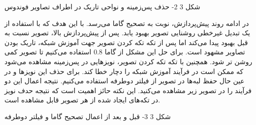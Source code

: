  
شکل ‏3 2- حذف پس‌زمینه و نواحی تاریک در اطراف تصاویر فوندوس

در ادامه روند پیش‌پردازش، نوبت به تصحیح گاما می‌رسد. با این هدف که با استفاده از یک تبدیل غیرخطی روشنایی تصویر بهبود یابد. پس از پیش‌پردازش بالا، تصویر نسبت به قبل بهبود پیدا می‌کند اما پس از تکه تکه کردن تصویر جهت آموزش شبکه، تاریک بودن تصاویر مشهود است. برای حل این مشکل از گاما 0.8 استفاده می‌کنیم تا تصویر کمی روشن تر شود.
همچنین با تکه تکه کردن تصویر، نویزهایی در پس‌زمینه مشاهده می‌شود که ممکن است در فرآیند آموزش شبکه را دچار خطا کند. برای حذف این نویزها و در عین حال حفظ لبه‌ها در تصویر از فیلتر دوطرفه  استفاده می‌کنیم.
نتیجه اعمال این دو فرآیند را در تصویر زیر مشاهده می‌کنید. این نکته حائز اهمیت است که نتیجه حدف نویز در تکه‌های ایجاد شده از هر تصویر قابل مشاهده است.

 
شکل ‏3 3- قبل و بعد از اعمال تصحیح گاما و فیلتر دوطرفه

